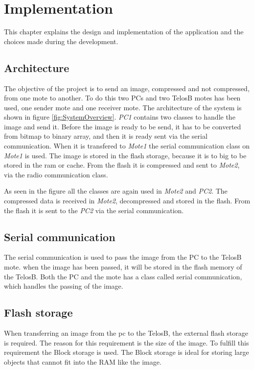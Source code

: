 \chapter{Implementation}
\label{chp:impl}

This chapter explains the design and implementation of the application and the choices made during the development.

\section{Architecture}
The objective of the project is to send an image, compressed and not compressed, from one mote to another. To do this two PCs and two TelosB motes has been used, one sender mote and one receiver mote. The architecture of the system is shown in figure \ref{fig:SystemOverview}. \emph{PC1} contains two classes to handle the image and send it. Before the image is ready to be send, it has to be converted from bitmap to binary array, and then it is ready sent via the serial communication. When it is transfered to \emph{Mote1} the serial communication class on \emph{Mote1} is used. The image is stored in the flash storage, because it is to big to be stored in the ram or cache. From the flash it is compressed and sent to \emph{Mote2}, via the radio communication class.


As seen in the figure all the classes are again used in \emph{Mote2} and \emph{PC2}. The compressed data is received in \emph{Mote2}, decompressed and stored in the flash. From the flash it is sent to the \emph{PC2} via the serial communication. 

\section{Serial communication}
The serial communication is used to pass the image from the PC to the TelosB mote. when the image has been passed, it will be stored in the flash memory of the TelosB. Both the PC and the mote has a class called serial communication, which handles the passing of the image.

\section{Flash storage}

When transferring an image from the pc to the TelosB, the external flash storage is required. The reason for this requirement is the size of the image. To fulfill this requirement the Block storage is used. The Block storage is ideal for storing large objects that cannot fit into the RAM like the image.

